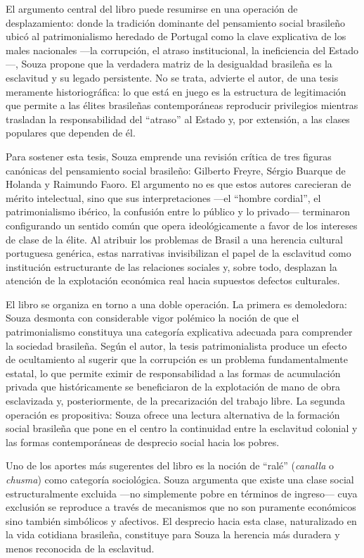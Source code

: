 El argumento central del libro puede resumirse en una operación de desplazamiento: donde la tradición dominante del pensamiento social brasileño ubicó al patrimonialismo heredado de Portugal como la clave explicativa de los males nacionales —la corrupción, el atraso institucional, la ineficiencia del Estado—, Souza propone que la verdadera matriz de la desigualdad brasileña es la esclavitud y su legado persistente. No se trata, advierte el autor, de una tesis meramente historiográfica: lo que está en juego es la estructura de legitimación que permite a las élites brasileñas contemporáneas reproducir privilegios mientras trasladan la responsabilidad del “atraso” al Estado y, por extensión, a las clases populares que dependen de él.

Para sostener esta tesis, Souza emprende una revisión crítica de tres figuras canónicas del pensamiento social brasileño: Gilberto Freyre, Sérgio Buarque de Holanda y Raimundo Faoro. El argumento no es que estos autores carecieran de mérito intelectual, sino que sus interpretaciones —el “hombre cordial”, el patrimonialismo ibérico, la confusión entre lo público y lo privado— terminaron configurando un sentido común que opera ideológicamente a favor de los intereses de clase de la élite. Al atribuir los problemas de Brasil a una herencia cultural portuguesa genérica, estas narrativas invisibilizan el papel de la esclavitud como institución estructurante de las relaciones sociales y, sobre todo, desplazan la atención de la explotación económica real hacia supuestos defectos culturales.

El libro se organiza en torno a una doble operación. La primera es demoledora: Souza desmonta con considerable vigor polémico la noción de que el patrimonialismo constituya una categoría explicativa adecuada para comprender la sociedad brasileña. Según el autor, la tesis patrimonialista produce un efecto de ocultamiento al sugerir que la corrupción es un problema fundamentalmente estatal, lo que permite eximir de responsabilidad a las formas de acumulación privada que históricamente se beneficiaron de la explotación de mano de obra esclavizada y, posteriormente, de la precarización del trabajo libre. La segunda operación es propositiva: Souza ofrece una lectura alternativa de la formación social brasileña que pone en el centro la continuidad entre la esclavitud colonial y las formas contemporáneas de desprecio social hacia los pobres.

Uno de los aportes más sugerentes del libro es la noción de “ralé” (\textit{canalla} o \textit{chusma}) como categoría sociológica. Souza argumenta que existe una clase social estructuralmente excluida —no simplemente pobre en términos de ingreso— cuya exclusión se reproduce a través de mecanismos que no son puramente económicos sino también simbólicos y afectivos. El desprecio hacia esta clase, naturalizado en la vida cotidiana brasileña, constituye para Souza la herencia más duradera y menos reconocida de la esclavitud.

